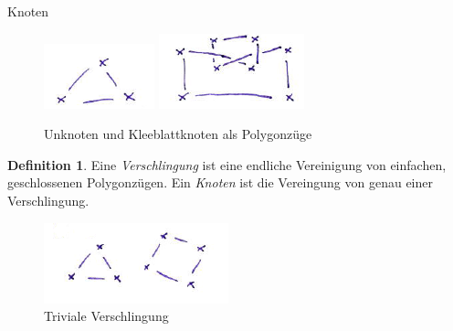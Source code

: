 \documentclass[a4paper,pagesizefontsize=12pt]{scrartcl}
\theoremstyle{definition}
\newtheorem{defi}{Definition}
\theoremstyle{remark}
\begin{document}
\begin{section}{Knoten}
\begin{figure}[H]
\center
\includegraphics[width=0.22\linewidth]{UnknotenPolygon}
\includegraphics[width=0.23\linewidth]{KleeblattknotenPolygon}
\caption*{Unknoten und Kleeblattknoten als Polygonzüge}
\end{figure}
\vspace{0.3cm}

\begin{defi}
Eine \textit{Verschlingung} ist eine endliche Vereinigung von einfachen, geschlossenen Polygonzügen. Ein \textit{Knoten} ist die Vereingung von genau einer Verschlingung.
\end{defi}

\begin{figure}[H]
\center
\includegraphics[width=0.35\linewidth]{Verschlingung}
\caption*{Triviale Verschlingung}
\end{figure}
\vspace{0.3cm}
\end{section}
\end{document}
